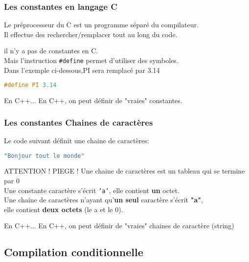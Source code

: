 \documentclass{beamer}
\begin{document}
\begin{frame}[fragile=singleslide,shrink=20]
\frametitle {Les constantes en langage C}
Le préprocesseur du C est un programme séparé du compilateur. \\
Il effectue des rechercher/remplacer tout au long du code.

il n'y a pas de constantes en C. \\
Mais l'instruction \texttt{\#define} permet d'utiliser des symboles. \\
Dans l'exemple ci-dessous,PI sera remplacé par 3.14

\begin{lstlisting}[language=c++]
#define PI 3.14
\end{lstlisting}

\begin{block}{En C++...}
En C++, on peut définir de "vraies" constantes.
\end{block}

\end{frame}

\begin{frame}[fragile=singleslide,shrink=20]
\frametitle {Les constantes Chaines de caractères}
Le code suivant définit une chaine de caractères:
\begin{lstlisting}[language=c++]
"Bonjour tout le monde"
\end{lstlisting}

\begin{block}{ATTENTION ! PIEGE !}
Une chaine de caractères est un tableau qui se termine par 0 \\
Une constante caractère s'écrit \texttt{'a'}, elle contient \textbf{un} octet.\\
Une chaine de caractères n'ayant qu'\textbf{un seul} caractère s'écrit \textbf{"a"}, \\
elle contient \textbf{deux octets} (le a et le 0).
\end{block}

\begin{block}{En C++...}
En C++, on peut définir de "vraies" chaines de caractère (string)
\end{block}

\end{frame}

\subsection{Compilation conditionnelle}
\end{document}
